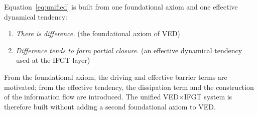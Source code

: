 Equation~\eqref{eq:unified} is built from one foundational axiom and one
effective dynamical tendency:

\begin{enumerate}
  \item \emph{There is difference.} (the foundational axiom of VED)
  \item \emph{Difference tends to form partial closure.}
        (an effective dynamical tendency used at the IFGT layer)
\end{enumerate}

From the foundational axiom, the driving and effective barrier terms are
motivated; from the effective tendency, the dissipation term and the
construction of the information flow are introduced. The unified
VED$\times$IFGT system is therefore built without adding a second
foundational axiom to VED.
